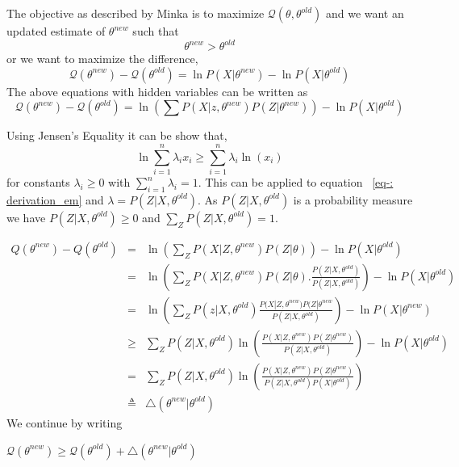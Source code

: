 \documentclass[12pt,draft]{dalcsthesis}
\begin{document}
The objective as described by Minka \cite{minka1998expectation} is to maximize $\mathcal{Q}(\theta,\theta^{old})$ and we want an updated estimate of $\theta^{new}$ such that 
\begin{equation}
\theta^{new}>\theta^{old}
\end{equation}
or we want to maximize the difference,
\begin{equation}
\mathcal{Q}(\theta^{new})-\mathcal{Q}(\theta^{old})=\ln P(X|\theta^{new}) - \ln P(X|\theta^{old})
\end{equation}
The above equations with hidden variables can be written as
\begin{equation}
\label{eq-:derivation_em}
\mathcal{Q}(\theta^{new})-\mathcal{Q}(\theta^{old})=\ln(\sum P(X|z,\theta^{new}) P(Z|\theta^{new})) - \ln P(X|\theta^{old})
\end{equation}

Using Jensen's Equality it can be show that,
\begin{equation}
\ln \sum_{i=1}^{n}\lambda_{i}x_{i} \geq \sum_{i=1}^{n}\lambda_{i}\ln(x_{i})
\end{equation}
for constants $\lambda_{i} \geq 0$ with $\sum_{i=1}^{n}\lambda_{i}=1$. This can be applied to equation ~\ref{eq-: derivation_em} and $\lambda=P(Z|X,\theta^{old})$. As $P(Z|X,\theta^{old})$ is a probability measure we have $P(Z|X,\theta^{old}) \geq 0$ and $\sum_{Z}P(Z|X,\theta^{old})=1$.

\begin{eqnarray}
Q(\theta^{new})-Q(\theta^{old}) & = & \ln(\sum_{Z}P(X|Z,\theta^{new})P(Z|\theta))-\ln P(X|\theta^{old})\\
 & = & \ln(\sum_{Z}P(X|Z,\theta^{new})P(Z|\theta).\frac{P(Z|X,\theta^{old})}{P(Z|X,\theta^{old})})-\ln P(X|\theta^{old})\\
 & = & \ln(\sum_{Z}P(z|X,\theta^{old})\frac{P(X|Z,\theta^{new})P(Z|\theta^{new}}{P(Z|X,\theta^{old})})-\ln P(X|\theta^{new})\\
 & \geq & \sum_{Z}P(Z|X,\theta^{old})\ln(\frac{P(X|Z,\theta^{new})P(Z|\theta^{new})}{P(Z|X,\theta^{old})})-\ln P(X|\theta^{old})\\
 & = & \sum_{Z}P(Z|X,\theta^{old})\ln(\frac{P(X|Z,\theta^{new})P(Z|\theta^{new})}{P(Z|X,\theta^{old})P(X|\theta^{old})})\\
 & \triangleq & \triangle(\theta^{new}|\theta^{old})
\end{eqnarray}
We continue by writing

$\mathcal{Q}(\theta^{new})\geq\mathcal{Q}(\theta^{old})+\triangle(\theta^{new}|\theta^{old})$
\end{document}
